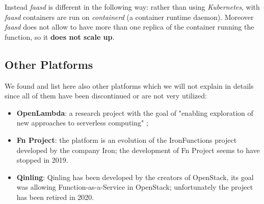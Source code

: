 Instead \textit{faasd} is different in the following way: rather than using \textit{Kubernetes}, with \textit{faasd} containers are run on \textit{containerd} (a container runtime daemon). Moreover \textit{faasd} does not allow to have more than one replica of the container running the function, so it \textbf{does not scale up}.


\subsection{Other Platforms}
We found and list here also other platforms which we will not explain in details since all of them have been discontinued or are not very utilized:
\begin{itemize}
    \item \textbf{OpenLambda}: a research project with the goal of "enabling exploration of new approaches to serverless computing" \cite{openlambda};
    \item \textbf{Fn Project}: the platform is an evolution of the IronFunctions project developed by the company Iron; the development of Fn Project seems to have stopped in 2019.
    \item \textbf{Qinling}: Qinling has been developed by the creators of OpenStack, its goal was allowing Function-as-a-Service in OpenStack; unfortunately the project has been retired in 2020.
\end{itemize}
